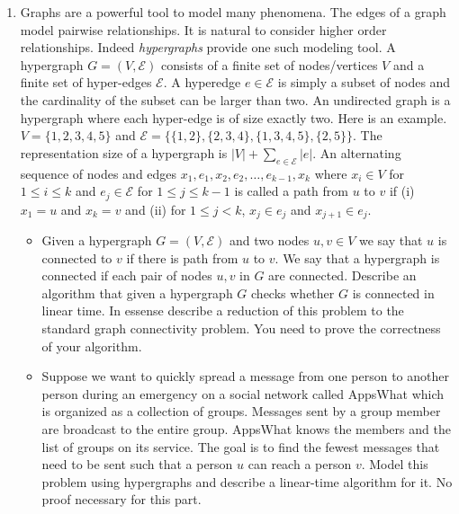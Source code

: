 \documentclass[11pt]{article}
\begin{document}
\vspace{1cm}

\begin{enumerate}


\item Graphs are a powerful tool to model many phenomena.  The edges
  of a graph model pairwise relationships. It is natural to consider
  higher order relationships.  Indeed {\em hypergraphs} provide one
  such modeling tool.  A hypergraph $G=(V,\mathcal{E})$ consists of a
  finite set of nodes/vertices $V$ and a finite set of hyper-edges
  $\mathcal{E}$. A hyperedge $e \in \mathcal{E}$ is simply a subset of
  nodes and the cardinality of the subset can be larger than two. An
  undirected graph is a hypergraph where each hyper-edge is of size
  exactly two. Here is an example. $V=\{1,2,3,4,5\}$ and $\mathcal{E}
  = \{\{1,2\},\{2,3,4\},\{1,3,4,5\},\{2,5\}\}$. The representation
  size of a hypergraph is $|V| + \sum_{e \in \mathcal{E}} |e|$.  An
  alternating sequence of nodes and edges
  $x_1,e_1,x_2,e_2,\ldots,e_{k-1},x_k$ where $x_i \in V$ for $1 \le i
  \le k$ and $e_j \in \mathcal{E}$ for $1 \le j \le k-1$ is called a
  path from $u$ to $v$ if (i) $x_1 = u$ and $x_k = v$ and (ii) for $1
  \le j < k$, $x_j \in e_j$ and $x_{j+1} \in e_j$.

  \begin{itemize}
  \item Given a hypergraph $G=(V,\mathcal{E})$ and two nodes $u,v \in V$
    we say that $u$ is connected to $v$ if there is path from $u$ to $v$.
    We say that a hypergraph is connected
    if each pair of nodes $u,v$ in $G$ are connected. Describe an algorithm that
    given a hypergraph $G$ checks whether $G$ is connected in linear time.
    In essense describe a reduction of this problem to the standard graph
    connectivity problem. You need to prove the correctness of your algorithm.
  \item Suppose we want to quickly spread a message from one person to
    another person during an emergency on a social network called
    AppsWhat which is organized as a collection of groups. Messages
    sent by a group member are broadcast to the entire group. AppsWhat
    knows the members and the list of groups on its service. The goal
    is to find the fewest messages that need to be sent such that a
    person $u$ can reach a person $v$. Model this problem using
    hypergraphs and describe a linear-time algorithm for it.
    No proof necessary for this part.
  \end{itemize}


\end{enumerate}
\end{document}
